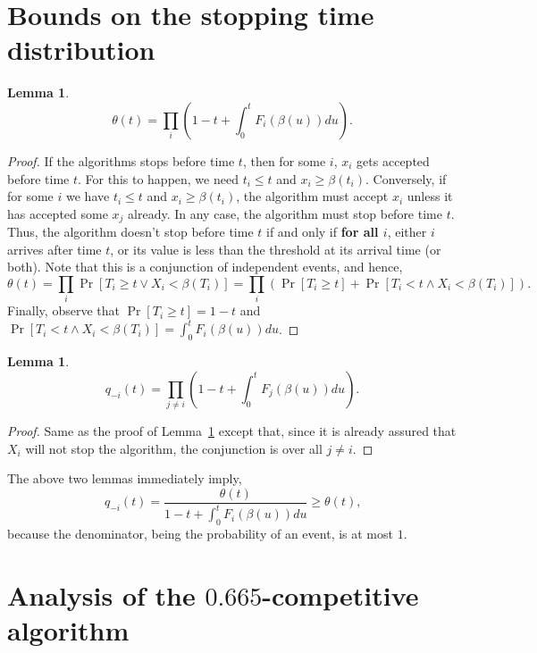 \documentclass[10pt, letterpaper, twoside]{article}
\newtheorem{lemma}[theorem]{Lemma}
\begin{document}
\section{Bounds on the stopping time distribution}

\begin{lemma}\label{lem_theta}
\[\theta(t)=\prod_i\left(1-t+\int_0^tF_i(\beta(u))du\right)\text{.}\]
\end{lemma}

\begin{proof}
If the algorithms stops before time $t$, then for some $i$, $x_i$ gets accepted before time $t$. For this to happen, we need $t_i\leq t$ and $x_i\geq\beta(t_i)$. Conversely, if for some $i$ we have $t_i\leq t$ and $x_i\geq\beta(t_i)$, the algorithm must accept $x_i$ unless it has accepted some $x_j$ already. In any case, the algorithm must stop before time $t$. Thus, the algorithm doesn't stop before time $t$ if and only if \textbf{for all $i$}, either $i$ arrives after time $t$, or its value is less than the threshold at its arrival time (or both). Note that this is a conjunction of independent events, and hence,
\[\theta(t)=\prod_i\Pr[T_i\geq t\vee X_i<\beta(T_i)]=\prod_i\left(\Pr[T_i\geq t]+\Pr[T_i<t\wedge X_i<\beta(T_i)]\right)\text{.}\]
Finally, observe that $\Pr[T_i\geq t]=1-t$ and $\Pr[T_i<t\wedge X_i<\beta(T_i)]=\int_0^tF_i(\beta(u))du$.
\end{proof}

\begin{lemma}
\[q_{-i}(t)=\prod_{j\neq i}\left(1-t+\int_0^tF_j(\beta(u))du\right)\text{.}\]
\end{lemma}

\begin{proof}
Same as the proof of Lemma~\ref{lem_theta} except that, since it is already assured that $X_i$ will not stop the algorithm, the conjunction is over all $j\neq i$.
\end{proof}

The above two lemmas immediately imply,
\begin{equation}\label{eqn_q_theta}
q_{-i}(t)=\frac{\theta(t)}{1-t+\int_0^tF_i(\beta(u))du}\geq\theta(t)\text{,}
\end{equation}
because the denominator, being the probability of an event, is at most $1$.

\section{Analysis of the $0.665$-competitive algorithm}
\end{document}
